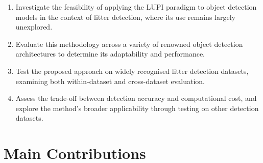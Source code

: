 \begin{enumerate}[label=\textbf{Objective (O\arabic*)}, leftmargin=*]
    \item Investigate the feasibility of applying the LUPI paradigm to object detection models in the context of litter detection, where its use remains largely unexplored.
    
    \item Evaluate this methodology across a variety of renowned object detection architectures to determine its adaptability and performance.
    
    \item Test the proposed approach on widely recognised litter detection datasets, examining both within-dataset and cross-dataset evaluation.
    
    \item Assess the trade-off between detection accuracy and computational cost, and explore the method’s broader applicability through testing on other detection datasets.
\end{enumerate}

\section{Main Contributions}
\label{sec:contributions}

